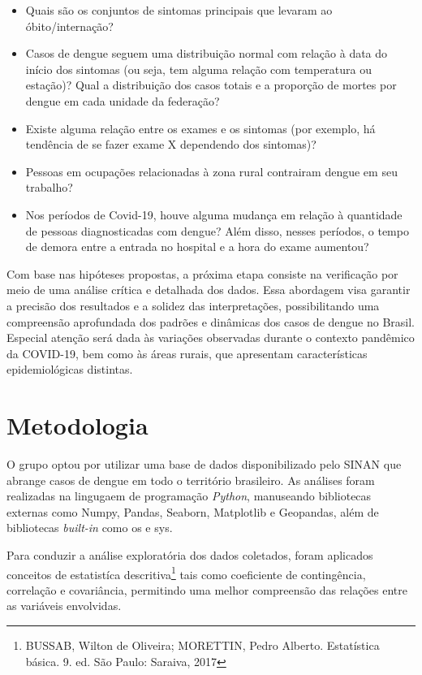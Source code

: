 \documentclass[a4paper,12pt]{article}
\begin{document}
\begin{itemize}
    \item Quais são os conjuntos de sintomas principais que levaram ao óbito/internação?
    \item Casos de dengue seguem uma distribuição normal com relação à data do início dos sintomas (ou seja, tem alguma relação com temperatura ou estação)? Qual a distribuição dos casos totais e a proporção de mortes por dengue em cada unidade da federação?
    \item Existe alguma relação entre os exames e os sintomas (por exemplo, há tendência de se fazer exame X dependendo dos sintomas)? 
    \item Pessoas em ocupações relacionadas à zona rural contrairam dengue em seu trabalho?
    \item Nos períodos de Covid-19, houve alguma mudança em relação à quantidade de pessoas diagnosticadas com dengue? Além disso, nesses períodos, o tempo de demora entre a entrada no hospital e a hora do exame aumentou?
\end{itemize}

Com base nas hipóteses propostas, a próxima etapa consiste na verificação por meio de uma análise crítica e detalhada dos dados. Essa abordagem visa garantir a precisão dos resultados e a solidez das interpretações, possibilitando uma compreensão aprofundada dos padrões e dinâmicas dos casos de dengue no Brasil. Especial atenção será dada às variações observadas durante o contexto pandêmico da COVID-19, bem como às áreas rurais, que apresentam características epidemiológicas distintas.

\clearpage

\section{Metodologia}
O grupo optou por utilizar uma base de dados disponibilizado pelo SINAN que abrange casos de dengue em todo o território brasileiro. As análises foram realizadas na lingugaem de programação \emph{Python}, manuseando bibliotecas externas como Numpy, Pandas, Seaborn, Matplotlib e Geopandas, além de bibliotecas \emph{built-in} como os e sys.

Para conduzir a análise exploratória dos dados coletados, foram aplicados conceitos de estatistíca descritiva\footnote{BUSSAB, Wilton de Oliveira; MORETTIN, Pedro Alberto. Estatística básica. 9. ed. São Paulo: Saraiva, 2017} tais como coeficiente de contingência, correlação e covariância, permitindo uma melhor compreensão das relações entre as variáveis envolvidas.
\end{document}
